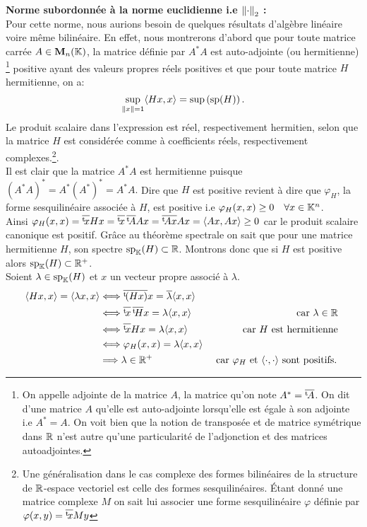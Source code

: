 \documentclass[12pt,a4paper]{article}
\begin{document}
	\textbf{Norme subordonnée à la norme euclidienne i.e $\left\|{\cdot}\right\|_2$ :} \\
	Pour cette norme, nous aurions besoin de quelques résultats d'algèbre linéaire voire même bilinéaire. En effet, nous montrerons d'abord que pour toute matrice carrée $A\in \mathbf{M}_n (\mathbb{K})$, la matrice définie par $A^*A$ est auto-adjointe (ou hermitienne) \footnote{On appelle adjointe de la matrice $A$, la matrice qu'on note $A^*=\overline{{}^\text{t}\! A}$. On dit d'une matrice $A$ qu'elle est auto-adjointe lorsqu'elle est égale à son adjointe i.e $A^*=A$. On voit bien que la notion de transposée et de matrice symétrique dans $\mathbb{R}$ n'est autre qu'une particularité de l'adjonction et des matrices autoadjointes.} positive ayant des valeurs propres réels positives et que pour toute matrice $H$ hermitienne, on a:
	$$ \sup_{\left\|{x}\right\|=1} \langle Hx, x\rangle=\sup\left(\text{sp}(H)\right). $$
	Le produit scalaire dans l'expression est réel, respectivement hermitien, selon que la matrice $H$ est considérée comme à coefficients réels, respectivement complexes.\footnote{Une généralisation dans le cas complexe des formes bilinéaires de la structure de $\mathbb{R}$-espace vectoriel est celle des formes sesquilinéaires. Étant donné une matrice complexe $M$ on sait lui associer une forme sesquilinéaire $\varphi$ définie par $\varphi (x, y)= \overline{{}^\text{t}\! x}My$  }.\\
	Il est clair que la matrice $A^*A$ est hermitienne puisque $(A^*A)^*=A^* (A^*)^*= A^* A.$ Dire que $H$ est positive revient à dire que $\varphi_H$, la forme sesquilinéaire associée à $H$, est positive i.e $\varphi_H (x,x)\geq 0\quad \forall x\in\mathbb{K}^n$.\\
	Ainsi $\varphi_H (x,x)=\overline{{}^\text{t}\! x}Hx=\overline{{}^\text{t}\! x}\,\overline{{}^\text{t}\! A}Ax=\overline{{}^\text{t}\! Ax}Ax=\langle Ax, Ax\rangle\geq0$ car le produit scalaire canonique est positif. Grâce au théorème spectrale on sait que pour une matrice hermitienne $H$, son spectre $\text{sp}_{\mathbb{K}}(H)\subset \mathbb{R}$. Montrons donc que si $H$ est positive alors $\text{sp}_{\mathbb{K}}(H)\subset \mathbb{R}^+$. \\
	Soient $\lambda\in\text{sp}_{\mathbb{K}}(H)$ et $x$ un vecteur propre associé à $\lambda$.
	\begin{align*}
		\langle Hx, x\rangle=\langle \lambda x, x\rangle &\Longleftrightarrow \overline{{}^\text{t}\! (Hx)}x=\overline{\lambda}\langle x, x\rangle\\
		&\Longleftrightarrow\overline{{}^\text{t}\! x}\,\overline{{}^\text{t}\! H}x = \lambda\langle x, x\rangle&\text{ car $\lambda\in \mathbb{R}$ }\\
		&\Longleftrightarrow\overline{{}^\text{t}\! x}Hx = \lambda\langle x, x\rangle&\text{ car $H$ est hermitienne }\\
		&\Longleftrightarrow\varphi_H(x,x)=\lambda\langle x, x\rangle\\
		&\Longrightarrow \lambda\in \mathbb{R}^+ &\text{ car $\varphi_H$ et $\langle \cdot, \cdot\rangle$ sont positifs. }
	\end{align*}
\end{document}
